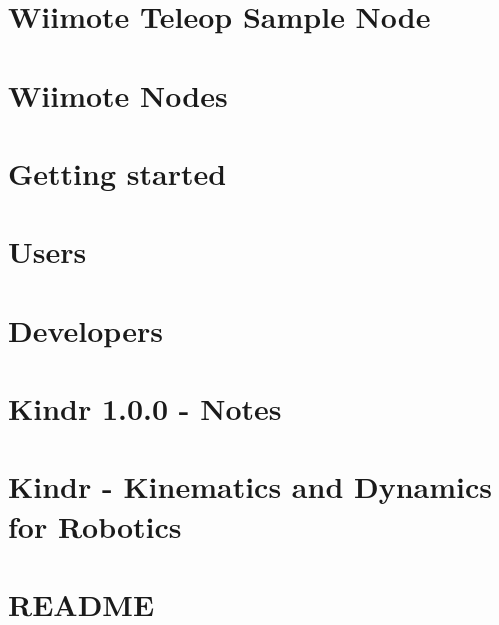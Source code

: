 \let\mypdfximage\pdfximage\def\pdfximage{\immediate\mypdfximage}\documentclass[twoside]{book}
\newcommand{\+}{\discretionary{\mbox{\scriptsize$\hookleftarrow$}}{}{}}
\begin{document}
\chapter{Wiimote Teleop Sample Node}
\label{md_catkin_ws_src_utilities_joystick_drivers_wiimote_doc_tutorials_teleop}

\chapter{Wiimote Nodes}
\label{md_catkin_ws_src_utilities_joystick_drivers_wiimote_README}

\chapter{Getting started}
\label{getting_started}

\chapter{Users}
\label{page_users}

\chapter{Developers}
\label{page_developers}

\chapter{Kindr 1.0.0 -\/ Notes}
\label{md_catkin_ws_src_utilities_kindr_doc_notes_kindr_1_80_80}

\chapter{Kindr -\/ Kinematics and Dynamics for Robotics}
\label{md_catkin_ws_src_utilities_kindr_README}

\chapter{R\+E\+A\+D\+ME}
\label{md_catkin_ws_src_utilities_ros-keyboard_README}

\end{document}
